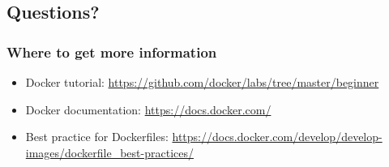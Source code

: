 \documentclass[aspectratio=169,11pt,hyperref={colorlinks=true}]{beamer}
\begin{document}
\subsection{Questions?}
\begin{frame}
\frametitle{Where to get more information}
    \begin{itemize}
        \item Docker tutorial: \href{https://github.com/docker/labs/tree/master/beginner}{https://github.com/docker/labs/tree/master/beginner}
        \item Docker documentation: \href{https://docs.docker.com/}{https://docs.docker.com/}
        \item Best practice for Dockerfiles: \href{https://docs.docker.com/develop/develop-images/dockerfile\_best-practices/}{https://docs.docker.com/develop/develop-images/dockerfile\_best-practices/}
    \end{itemize}
\end{frame}
\end{document}
